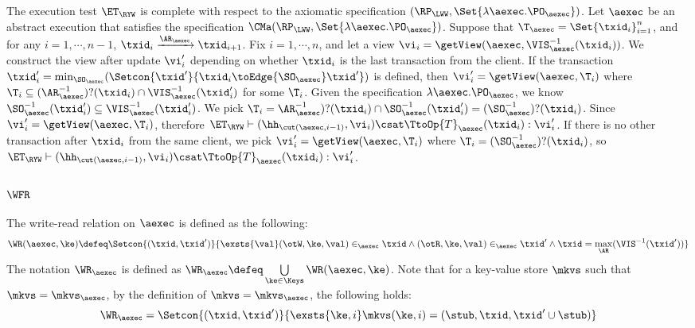 The execution test $\ET_{\RYW}$ is complete with respect to 
the axiomatic specification $(\RP_{\LWW}, \Set{\lambda \aexec.\PO_{\aexec} })$. 
Let $\aexec$ be an abstract execution that satisfies the specification
$\CMa(\RP_{\LWW}, \Set{\lambda \aexec.\PO_{\aexec} })$.
Suppose that $\T_{\aexec} = \Set{\txid_{i}}_{i=1}^{n}$, and for any $i=1,\cdots, n-1$,
$\txid_{i} \xrightarrow{\AR_{\aexec}} \txid_{i+1}$.
Fix $i=1,\cdots,n$, and let a view $\vi_{i} = \getView(\aexec, \VIS^{-1}_{\aexec}(\txid_{i}))$.
We construct the view after update \( \vi'_i\) depending on whether \( \txid_i \) is the last transaction from the client.
If the transaction \( \txid'_i = \min_{\SO_\aexec}(\Setcon{\txid'}{\txid_i \toEdge{\SO_\aexec} \txid' } ) \)  is defined,
then \( \vi'_i = \getView(\aexec, \T_i) \) where \( \T_i \subseteq (\AR_{\aexec}^{-1})?(\txid_i) \cap \VIS_\aexec^{-1}(\txid'_i) \) for some \( \T_i \).
Given the specification \( \lambda \aexec.\PO_{\aexec} \), 
we know \( \SO_\aexec^{-1}(\txid'_i) \subseteq \VIS_\aexec^{-1}(\txid'_i) \).
We pick \( \T_i = \AR_\aexec^{-1})?(\txid_i) \cap \SO_\aexec^{-1}(\txid'_i) = (\SO_\aexec^{-1})?(\txid_i) \).
Since \( \vi'_i = \getView(\aexec, \T_i) \), therefore \( \ET_\RYW \vdash (\hh_{\cut(\aexec, i-1)}, \vi_i) \csat \TtoOp{T}_{\aexec}(\txid_{i}) : \vi'_{i} \).
If there is no other transaction after \( \txid_i \) from the same client,
we pick \( \vi'_i = \getView(\aexec, \T_i) \) where \( \T_i = (\SO_\aexec^{-1})?(\txid_i) \),
so \( \ET_\RYW \vdash (\hh_{\cut(\aexec, i-1)}, \vi_i) \csat \TtoOp{T}_{\aexec}(\txid_{i}) : \vi'_{i} \).

\subsubsection{ \( \WFR \) }

\label{sec:sound-complete-wfr}

The write-read relation  on \( \aexec \) is defined as the following:
\[
\WR(\aexec, \ke) \defeq \Setcon{ (\txid, \txid') }{ \exsts{\val} (\otW, \ke, \val) \in_\aexec \txid \land (\otR, \ke, \val) \in_\aexec \txid' \land \txid = \max_\AR(\VIS^{-1}(\txid')) }
\]
The notation \( \WR_\aexec \) is defined as \( \WR_\aexec \defeq \bigcup\limits_{\ke \in \Keys} \WR(\aexec, \ke) \).
Note that for a key-value store \( \mkvs \) such that \( \mkvs = \mkvs_\aexec \),
by the definition of  \(  \mkvs = \mkvs_\aexec \), 
the following holds:
\[
    \WR_\aexec = \Setcon{(\txid, \txid')}{\exsts{\ke, i } \mkvs(\ke, i) = (\stub, \txid, \txid'\cup \stub)}
\]

